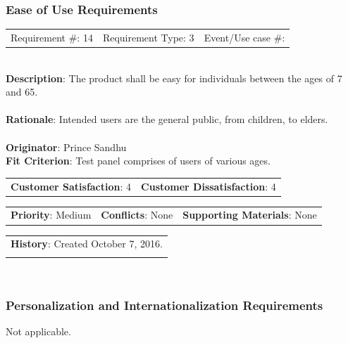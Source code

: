 \documentclass[12pt, titlepage]{article}
\begin{document}
\subsubsection{Ease of Use Requirements}

\begin{reqbox}

\begin{tabular}{lll}
Requirement \#: 14 & Requirement Type: 3 & Event/Use case \#: \\
\end{tabular} \\

\textbf{Description}: The product shall be easy for individuals between the ages of 7 and 65. \\ \\
\textbf{Rationale}: Intended users are the general public, from children, to elders. \\ \\
\textbf{Originator}: Prince Sandhu \\
\textbf{Fit Criterion}: Test panel comprises of users of various ages. \\

\begin{tabular}{ll}
\textbf{Customer Satisfaction}: 4 & \textbf{Customer Dissatisfaction}: 4 \\
\end{tabular}

\begin{tabular}{lll}
\textbf{Priority}: Medium & \textbf{Conflicts}: None & \textbf{Supporting Materials}: None \\
\end{tabular}

\begin{tabular}{l}
\textbf{History}: Created October 7, 2016.\\ \\
\end{tabular} \\

\end{reqbox}
\subsubsection{Personalization and Internationalization Requirements}
Not applicable.
\newpage
\end{document}

